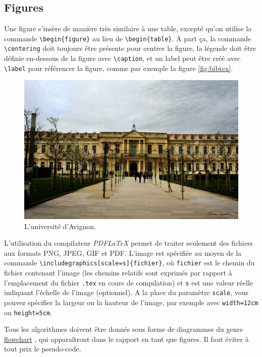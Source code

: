 \documentclass{ceri}
\begin{document}
	
\subsection{Figures}
\label{sec:figures}
Une figure s'insère de manière très similaire à une table, excepté qu'on utilise la commande \texttt{\textbackslash{}begin\{figure\}} au lieu de \texttt{\textbackslash{}begin\{table\}}. A part ça, la commande \texttt{\textbackslash{}centering} doit toujours être présente pour centrer la figure, la légende doit être définie en-dessous de la figure avec \texttt{\textbackslash{}caption}, et un label peut être créé avec \texttt{\textbackslash{}label} pour référencer la figure, comme par exemple la figure \ref{fig:bibtex}.

\begin{figure}[th]
	\centering
	\includegraphics[scale=0.5]{images/univ.jpg}
	\caption{L'université d'Avignon.}
	\label{fig:uapv}
\end{figure}

L'utilisation du compilateur \textit{PDFLaTeX} permet de traiter seulement des fichiers aux formats PNG, JPEG, GIF et PDF. L'image est spécifiée au moyen de la commande \texttt{\textbackslash{}includegraphics[scale=s]\{fichier\}}, où \texttt{fichier} est le chemin du fichier contenant l'image (les chemins relatifs sont exprimés par rapport à l'emplacement du fichier \texttt{.tex} en cours de compilation) et \texttt{s} est une valeur réelle indiquant l'échelle de l'image (optionnel). A la place du paramètre \texttt{scale}, vous pouvez spécifier la largeur ou la hauteur de l'image, par exemple avec \texttt{width=12cm} ou \texttt{height=5cm}.

Tous les algorithmes doivent être donnés sous forme de diagrammes du genre \href{http://en.wikipedia.org/wiki/Flowchart}{flowchart} \cite{Wikipedia2011}, qui apparaîtront dans le rapport en tant que figures. Il faut éviter à tout prix le pseudo-code. 
\end{document}
